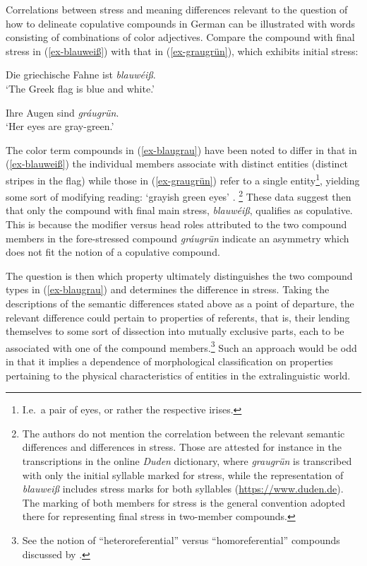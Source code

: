 \documentclass[output=paper
 ,nobabel
 ,draftmode
 ,colorlinks, citecolor=brown
]{langscibook}
\begin{document}
Correlations between stress and meaning differences relevant to the question of how to delineate copulative compounds in German can be illustrated with words consisting of combinations of color adjectives. Compare the compound with final stress in (\ref{ex-blauweiß}) with that in  (\ref{ex-graugrün}), which exhibits initial stress:

\eal\label{ex-blaugrau}
\ex\label{ex-blauweiß}
Die griechische Fahne ist \emph{blauwéiß}. \\
`The Greek flag is blue and white.'

\ex\label{ex-graugrün}
Ihre Augen sind \emph{gráugrün}.\\
`Her eyes are gray-green.'
\zl

\noindent
The color term compounds in (\ref{ex-blaugrau}) have been noted to differ in that in (\ref{ex-blauweiß}) the individual members associate with distinct entities (\eg distinct stripes in the flag) while those in (\ref{ex-graugrün}) refer to a single entity\footnote{I.e.\ a pair of eyes, or rather the respective irises.}, yielding some sort of modifying reading:
`grayish green eyes' \citep[44]{Puempeletal1992}.%
%
\footnote{The authors do not mention the correlation between the relevant semantic differences and differences in stress. Those are attested for instance in the transcriptions in the online \emph{Duden} dictionary, where \emph{graugrün} is transcribed with only the initial syllable marked for stress, while the representation of \emph{blauweiß} includes stress marks for both syllables (\url{https://www.duden.de}). The marking of both members for stress is the general convention adopted there for representing final stress in two-member compounds.} 
These data suggest then that only the compound with final main stress, \emph{blauwéiß}, qualifies as
copulative. This is because the modifier versus head roles attributed to the two compound members in
the fore-stressed compound \emph{gráugrün} indicate an asymmetry which does not fit the notion of a
copulative compound.  

The question is then which property ultimately distinguishes the two compound types in (\ref{ex-blaugrau}) and determines the difference in stress. Taking the descriptions of the semantic differences stated above as a point of departure, the relevant difference could pertain to properties of referents, that is, their lending themselves to some sort of dissection into mutually exclusive parts, each to be associated with one of the compound members.\footnote{See the notion of ``heteroreferential'' versus ``homoreferential'' compounds discussed by \citet[608]{Renner2008}.} Such an approach would be odd in that  it implies a dependence of morphological classification on properties pertaining to the physical characteristics of entities in the extralinguistic world.
 
\end{document}
